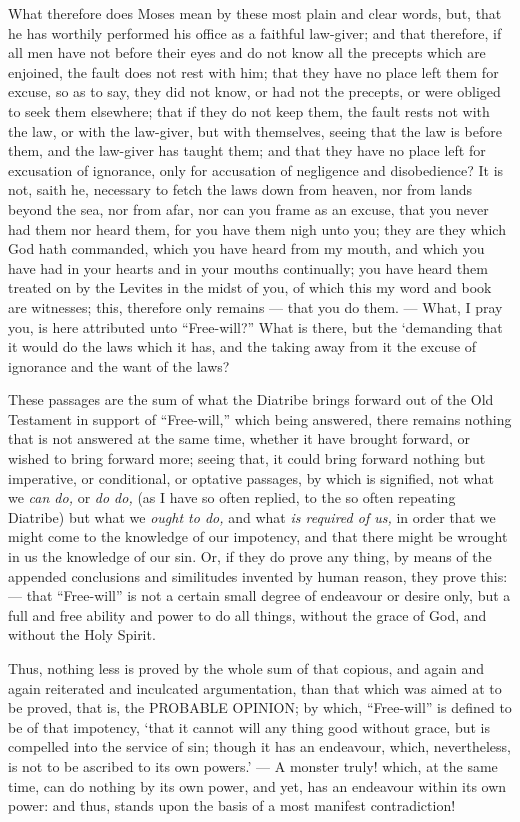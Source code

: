 What therefore does Moses mean by these most plain and clear words, but, that he has worthily performed his office as a faithful law-giver; and that therefore, if all men have not before their eyes and do not know all the precepts which are enjoined, the fault does not rest with him; that they have no place left them for excuse, so as to say, they did not know, or had not the precepts, or were obliged to seek them elsewhere; that if they do not keep them, the fault rests not with the law, or with the law-giver, but with themselves, seeing that the law is before them, and the law-giver has taught them; and that they have no place left for excusation of ignorance, only for accusation of negligence and disobedience? It is not, saith he, necessary to fetch the laws down from heaven, nor from lands beyond the sea, nor from afar, nor can you frame as an excuse, that you never had them nor heard them, for you have them nigh unto you; they are they which God hath commanded, which you have heard from my mouth, and which you have had in your hearts and in your mouths continually; you have heard them treated on by the Levites in the midst of you, of which this my word and book are witnesses; this, therefore only remains — that you do them. — What, I pray you, is here attributed unto “Free-will?” What is there, but the ‘demanding that it would do the laws which it has, and the taking away from it the excuse of ignorance and the want of the laws?

These passages are the sum of what the Diatribe brings forward out of the Old Testament in support of “Free-will,” which being answered, there remains nothing that is not answered at the same time, whether it have brought forward, or wished to bring forward more; seeing that, it could bring forward nothing but imperative, or conditional, or optative passages, by which is signified, not what we \emph{can do, }or \emph{do do, }(as I have so often replied, to the so often repeating Diatribe) but what we \emph{ought to do, }and what \emph{is required of us, }in order that we might come to the knowledge of our impotency, and that there might be wrought in us the knowledge of our sin. Or, if they do prove any thing, by means of the appended conclusions and similitudes invented by human reason, they prove this: — that “Free-will” is not a certain small degree of endeavour or desire only, but a full and free ability and power to do all things, without the grace of God, and without the Holy Spirit.

Thus, nothing less is proved by the whole sum of that copious, and again and again reiterated and inculcated argumentation, than that which was aimed at to be proved, that is, the \textsc{PROBABLE OPINION}; by which, “Free-will” is defined to be of that impotency, ‘that it cannot will any thing good without grace, but is compelled into the service of sin; though it has an endeavour, which, nevertheless, is not to be ascribed to its own powers.’ — A monster truly! which, at the same time, can do nothing by its own power, and yet, has an endeavour within its own power: and thus, stands upon the basis of a most manifest contradiction!

